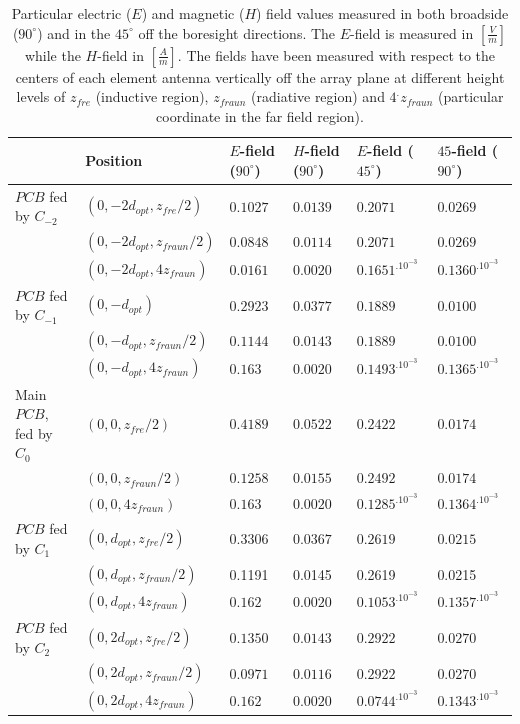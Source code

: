 \documentclass[10 pt,a4paper,twocolumn]{article}
\begin{document}
{\begin{table}[bt!]
\begin{center}
{\begin{tabular}{|m{4cm}|m{2.6cm}|m{2cm}|m{2cm}|m{2.3cm}|m{2.3cm}|}
				& Position & $E$-field ($90^\circ$) & $H$-field ($90^\circ$) & $E$-field ($45^\circ$) & $45$-field ($90^\circ$) \\
				\hline 
				$PCB$ fed by $C_{-2}$ & $(0,-2d_{opt},z_{fre}/2)$ & $0.1027$ & $0.0139$ & $0.2071$ & $0.0269$ \\ 
				 &  $(0,-2d_{opt},z_{fraun}/2)$ & $0.0848$ & $0.0114$ &$0.2071$	 & $0.0269$ \\
				 & $(0,-2d_{opt},4z_{fraun})$& $0.0161$& $0.0020$ &$0.1651^.10^{-3}$ & $0.1360^.10^{-3}$ \\
				\hline
				 $PCB$ fed by $C_{-1}$ & $(0,-d_{opt})$ & $0.2923$ & $0.0377$ & $0.1889$ & $0.0100$ \\
				 &$(0,-d_{opt},z_{fraun}/2)$ &$0.1144$ & $0.0143$&$0.1889$ & $0.0100$\\
					 & $(0,-d_{opt},4z_{fraun})$& $0.163$& $0.0020$& $0.1493^.10^{-3}$& $0.1365^.10^{-3}$\\
				\hline
				Main $PCB$, fed by $C_{0}$ & $(0,0,z_{fre}/2)$& $0.4189$& $0.0522$& $0.2422$ & $0.0174$ \\
			 & $(0,0,z_{fraun}/2)$& $0.1258$& $0.0155$& $0.2492$& $0.0174$\\
				 & $(0,0,4z_{fraun})$ & $0.163$& $0.0020$& $0.1285^.10^{-3}$& $0.1364^.10^{-3}$\\
				\hline 
				 $PCB$ fed by $C_{1}$ & $(0,d_{opt},z_{fre}/2)$ & $0.3306$ & $0.0367$ & $0.2619$ & $0.0215$ \\
				 & $(0,d_{opt},z_{fraun}/2)$& 0.1191& 0.0145&0.2619& 0.0215\\
					 & $(0,d_{opt},4z_{fraun})$& $0.162$& $0.0020$& $0.1053^.10^{-3}$& $0.1357^.10^{-3}$\\
				\hline 
				 $PCB$ fed by $C_{2}$& $(0,2d_{opt},z_{fre}/2)$ & $0.1350$ & $0.0143$ & $0.2922$ & $0.0270$ \\
				 & $(0,2d_{opt},z_{fraun}/2)$&$0.0971$ & $0.0116$&$0.2922$ & $0.0270$\\ 
					 & $(0,2d_{opt},4z_{fraun})$& $0.162$ & $0.0020$ & $0.0744^.10^{-3}$&$0.1343^.10^{-3}$ \\
				\hline
		\end{tabular}}
		\caption{Particular electric ($E$) and magnetic ($H$) field values measured in both broadside ($90^\circ$) and in the $45^\circ$ off the boresight directions. The $E$-field is measured in $\left[\frac{V}{m}\right]$ while the $H$-field in $\left[\frac{A}{m}\right]$. The fields have been measured with respect to the centers of each element antenna vertically off the array plane at different height levels of $z_{fre}$ (inductive region), $z_{fraun}$ (radiative region) and $4^.z_{fraun}$ (particular coordinate in the far field region).}  

\end{center}
\end{table}}
\end{document}

